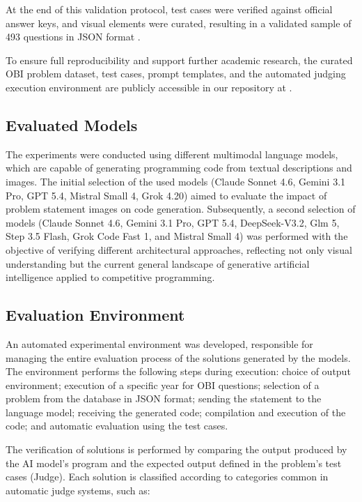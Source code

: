 \documentclass[conference]{IEEEtran}
\begin{document}
At the end of this validation protocol, test cases were verified against official answer keys, and visual elements were curated, resulting in a validated sample of 493 questions in JSON format \cite{problems2026}.

To ensure full reproducibility and support further academic research, the curated OBI problem dataset, test cases, prompt templates, and the automated judging execution environment are publicly accessible in our repository at \cite{obibenchmarking2026}.

\subsection{Evaluated Models}\label{subsec:models}

The experiments were conducted using different multimodal language models, which are capable of generating programming code from textual descriptions and images. The initial selection of the used models (Claude Sonnet 4.6, Gemini 3.1 Pro, GPT 5.4, Mistral Small 4, Grok 4.20) aimed to evaluate the impact of problem statement images on code generation. Subsequently, a second selection of models (Claude Sonnet 4.6, Gemini 3.1 Pro, GPT 5.4, DeepSeek-V3.2, Glm 5, Step 3.5 Flash, Grok Code Fast 1, and Mistral Small 4) was performed with the objective of verifying different architectural approaches, reflecting not only visual understanding but the current general landscape of generative artificial intelligence applied to competitive programming.

\subsection{Evaluation Environment}\label{subsec:evaluation}

An automated experimental environment was developed, responsible for managing the entire evaluation process of the solutions generated \cite{obibenchmarking2026} by the models. The environment performs the following steps during execution: choice of output environment; execution of a specific year for OBI questions; selection of a problem from the database in JSON format; sending the statement to the language model; receiving the generated code; compilation and execution of the code; and automatic evaluation using the test cases.

The verification of solutions is performed by comparing the output produced by the AI model's program and the expected output defined in the problem's test cases (Judge). Each solution is classified according to categories common in automatic judge systems, such as:
\end{document}

